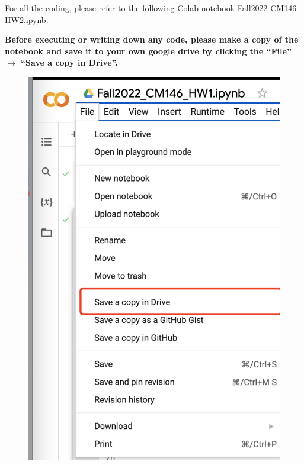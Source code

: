 For all the coding, please refer to the following Colab notebook
\href{https://colab.research.google.com/drive/1QSVDbmWZHVEye__A1wC9u6qhycnUG1Ks?usp=sharing}{Fall2022-CM146-HW2.ipynb}. 


\textbf{Before executing or writing down any code, please make a copy of the notebook and save it to your own google drive by clicking the “File” $\rightarrow$ “Save a copy in Drive”.} 

\begin{figure}[ht]
\centering
\includegraphics[scale=0.25]{save-colab-to-drive.png}
\end{figure}

